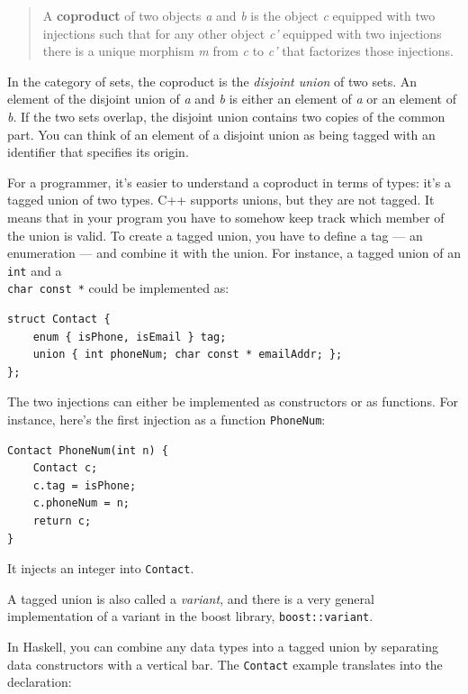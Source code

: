 \begin{quote}
A \textbf{coproduct} of two objects \emph{a} and \emph{b} is the object
\emph{c} equipped with two injections such that for any other object
\emph{c'} equipped with two injections there is a unique morphism
\emph{m} from \emph{c} to \emph{c'} that factorizes those injections.
\end{quote}

\noindent
In the category of sets, the coproduct is the \emph{disjoint union} of
two sets. An element of the disjoint union of \emph{a} and \emph{b} is
either an element of \emph{a} or an element of \emph{b}. If the two sets
overlap, the disjoint union contains two copies of the common part. You
can think of an element of a disjoint union as being tagged with an
identifier that specifies its origin.

For a programmer, it's easier to understand a coproduct in terms of
types: it's a tagged union of two types. C++ supports unions, but they
are not tagged. It means that in your program you have to somehow keep
track which member of the union is valid. To create a tagged union, you
have to define a tag --- an enumeration --- and combine it with the
union. For instance, a tagged union of an \texttt{int} and a\\
\texttt{char const *} could be implemented as:

\begin{verbatim}
struct Contact { 
    enum { isPhone, isEmail } tag;
    union { int phoneNum; char const * emailAddr; };
};
\end{verbatim}

\noindent
The two injections can either be implemented as constructors or as
functions. For instance, here's the first injection as a function
\texttt{PhoneNum}:

\begin{verbatim}
Contact PhoneNum(int n) { 
    Contact c;
    c.tag = isPhone;
    c.phoneNum = n;
    return c;
}
\end{verbatim}

\noindent
It injects an integer into \texttt{Contact}.

A tagged union is also called a \emph{variant}, and there is a very
general implementation of a variant in the boost library,
\texttt{boost::variant}.

In Haskell, you can combine any data types into a tagged union by
separating data constructors with a vertical bar. The \texttt{Contact}
example translates into the declaration:

